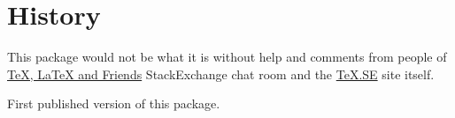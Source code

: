 \documentclass[paper=B5,DIV=calc,parskip=half]{scrartcl}
\begin{document}
\section{History}%
%
This package would not be what it is without help and comments from people of
\href{http://chat.stackexchange.com/rooms/41/tex-latex-and-friends}{\TeX{},
  \LaTeX{} and Friends} StackExchange chat room and the
\href{http://tex.stackexchange.com/}{\TeX.SE} site itself.

\begin{description}[style=nextline, labelwidth=4.5em, leftmargin=!,
  labelindent=0em]
  \item[\texttt{v0.01}] First published version of this package.
\end{description}
\end{document}
